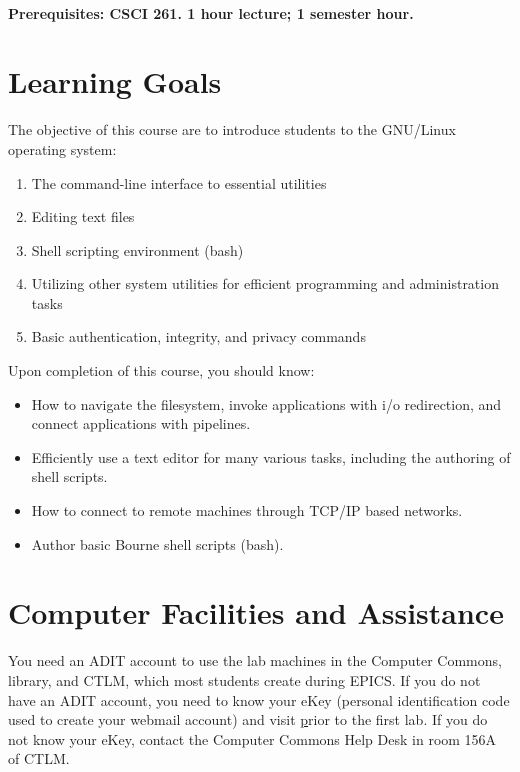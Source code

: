 \documentclass[12pt]{article}
\begin{document}
\paragraph{Prerequisites: CSCI 261. 1 hour lecture; 1 semester hour.}
\section{Learning Goals}
The objective of this course are to introduce students to the GNU/Linux operating system:

\begin{enumerate}
  \item The command-line interface to essential utilities
  \item Editing text files
  \item Shell scripting environment (bash)
  \item Utilizing other system utilities for efficient programming and administration tasks
  \item Basic authentication, integrity, and privacy commands 
\end{enumerate}

Upon completion of this course, you should know:
\begin{itemize}
  \item How to navigate the filesystem, invoke applications with i/o redirection, and connect applications with pipelines.
  \item Efficiently use a text editor for many various tasks, including the authoring of shell scripts.
  \item How to connect to remote machines through TCP/IP based networks.
  \item Author basic Bourne shell scripts (bash). 
\end{itemize}
\section{Computer Facilities and Assistance}
You need an ADIT account to use the lab machines in the Computer Commons, library, and CTLM, which most students create during EPICS. If you do not
have an ADIT account, you need to know your eKey (personal identification code used to create your webmail account) and visit
\href{http://newuser.mines.edu/adit} prior to the first lab. If you do not know your eKey, contact the Computer Commons Help Desk in room 156A of CTLM.
\end{document}
